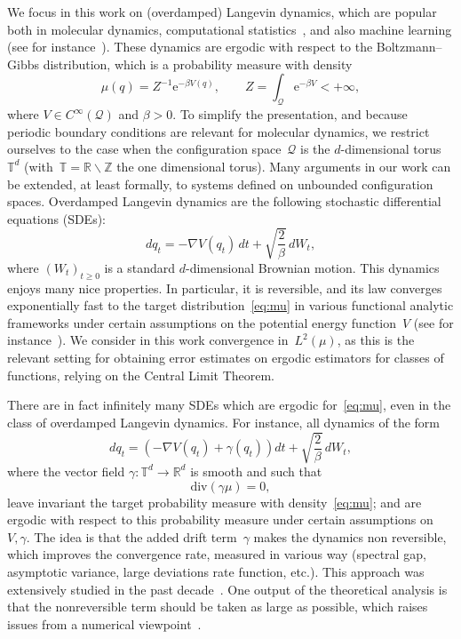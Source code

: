 \documentclass{article}
\newcommand{\rme}{\mathrm{e}}
\newcommand{\R}{\mathbb{R}}
\renewcommand{\geq}{\geqslant}
\def\R{\mathbb{R}}
\def\T{\mathbb{T}}
\renewcommand{\dim}{d}
\begin{document}
We focus in this work on (overdamped) Langevin dynamics, which are popular both in molecular dynamics, computational statistics~\cite{RobertsTweedie1996}, and also machine learning (see for instance~\cite{CFG14}). These dynamics are ergodic with respect to the Boltzmann--Gibbs distribution, which is a probability measure with density 
\begin{equation}
\label{eq:mu}
\mu(q) = Z^{-1}\rme^{-\beta V(q)}, \qquad Z = \int_\mathcal{Q} \rme^{-\beta V} < +\infty,
\end{equation} 
where $V \in C^\infty(\mathcal{Q})$ and $\beta>0$. To simplify the presentation, and because periodic boundary conditions are relevant for molecular dynamics, we restrict ourselves to the case when the configuration space~$\mathcal{Q}$ is the $\dim$-dimensional torus~$\T^\dim$ (with~$\T = \mathbb{R}\backslash \mathbb{Z}$ the one dimensional torus). Many arguments in our work can be extended, at least formally, to systems defined on unbounded configuration spaces. Overdamped Langevin dynamics are the following stochastic differential equations (SDEs):
\[
dq_t = -\nabla V(q_t) \, dt + \sqrt{\frac2\beta} \, dW_t,
\]
where $(W_t)_{t \geq 0}$ is a standard $\dim$-dimensional Brownian motion. This dynamics enjoys many nice properties. In particular, it is reversible, and its law converges exponentially fast to the target distribution~\eqref{eq:mu} in various functional analytic frameworks under certain assumptions on the potential energy function~$V$ (see for instance~\cite{bakry}). We consider in this work convergence in~$L^2(\mu)$, as this is the relevant setting for obtaining error estimates on ergodic estimators for classes of functions, relying on the Central Limit Theorem.

There are in fact infinitely many SDEs which are ergodic for~\eqref{eq:mu}, even in the class of overdamped Langevin dynamics. For instance, all dynamics of the form
\[
dq_t = \left( -\nabla V(q_t) + \gamma(q_t)\right) dt + \sqrt{\frac2\beta} \, dW_t,
\]
where the vector field $\gamma:\T^\dim\to \R^\dim$ is smooth and such that
\[
\mathrm{div}\left( \gamma \mu \right) = 0,
\]
leave invariant the target probability measure with density~\eqref{eq:mu}; and are ergodic with respect to this probability measure under certain assumptions on~$V,\gamma$. The idea is that the added drift term~$\gamma$ makes the dynamics non reversible, which improves the convergence rate, measured in various way (spectral gap, asymptotic variance, large deviations rate function, etc.). This approach was extensively studied in the past decade~\cite{HHS93,HHS05,LelievreNierPavliotis2013,RS15,RBS16,DLP16,DPZ17}. One output of the theoretical analysis is that the nonreversible term should be taken as large as possible, which raises issues from a numerical viewpoint~\cite{LS18}. 
\end{document}
